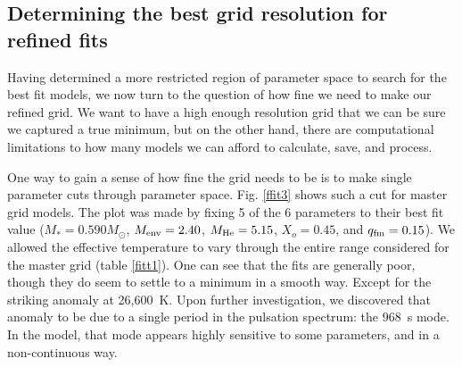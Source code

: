 \documentclass[12pt,preprint]{aastex}
\begin{document}

\subsection{Determining the best grid resolution for refined fits}

Having determined a more restricted region of parameter space to search for 
the best fit models, we now turn to the question of how fine we need to 
make our refined grid. We want to have a high enough resolution grid that 
we can be sure we captured a true minimum, but on the other hand, there are 
computational limitations to how many models we can afford to calculate, 
save, and process.

One way to gain a sense of how fine the grid needs to be is to make single 
parameter cuts through parameter space. Fig.  \ref{ffit3} shows such a cut 
for master grid models. The plot was made by fixing 5 of the 6 parameters 
to their best fit value 
($M_*=0.590 M_{\odot}$, $M_{\rm env}=2.40$, $M_{\rm He}=5.15$, $X_o=0.45$, and $q_{\rm fm}=0.15$). 
We allowed the effective temperature to vary through the entire range 
considered for the master grid (table \ref{fitt1}). One can see that the 
fits are generally poor, though they do seem to settle to a minimum in a 
smooth way. Except for the striking anomaly at 26,600~K. Upon further 
investigation, we discovered that anomaly to be due to a single period in 
the pulsation spectrum: the 968~s mode. In the model, that mode appears 
highly sensitive to some parameters, and in a non-continuous way.
\end{document}
